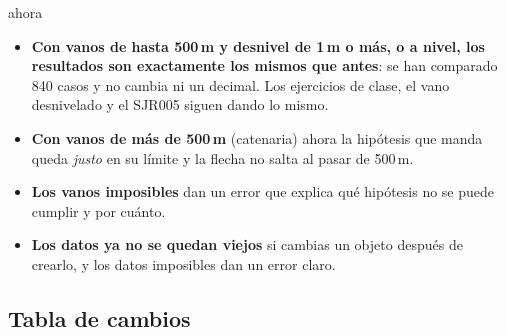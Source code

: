 \documentclass[11pt,a4paper]{article}
\begin{document}
\begin{caja}[title=Lo más importante]{ahora}
\begin{itemize}[leftmargin=1.2em, itemsep=2pt]
  \item \textbf{Con vanos de hasta 500\,m y desnivel de 1\,m o más, o a nivel, los resultados son exactamente los mismos que antes}: se han comparado 840 casos y no cambia ni un decimal. Los ejercicios de clase, el vano desnivelado y el SJR005 siguen dando lo mismo.
  \item \textbf{Con vanos de más de 500\,m} (catenaria) ahora la hipótesis que manda queda \emph{justo} en su límite y la flecha no salta al pasar de 500\,m.
  \item \textbf{Los vanos imposibles} dan un error que explica qué hipótesis no se puede cumplir y por cuánto.
  \item \textbf{Los datos ya no se quedan viejos} si cambias un objeto después de crearlo, y los datos imposibles dan un error claro.
\end{itemize}
\end{caja}

\subsection*{Tabla de cambios}
\end{document}
